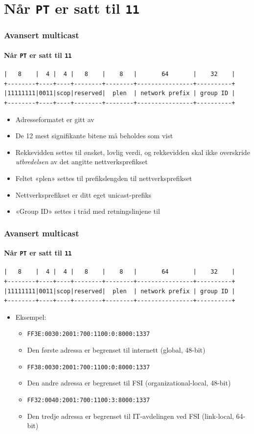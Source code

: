 \section{Når \texttt{PT} er satt til \texttt{11}}
\begin{frame}[fragile]%
  \frametitle{Avansert multicast}
  \framesubtitle{Når \texttt{PT} er satt til \texttt{11}}
  \pause
\begin{Verbatim}[fontsize=\tiny]
|   8    |  4 |  4 |   8    |    8   |       64       |    32    |
+--------+----+----+--------+--------+----------------+----------+
|11111111|0011|scop|reserved|  plen  | network prefix | group ID |
+--------+----+----+--------+--------+----------------+----------+
\end{Verbatim}
  \pause
  \begin{itemize}[<+->]
  \item Adresseformatet er gitt av 
  \item De 12 mest signifikante bitene må beholdes som vist
  \item Rekkevidden settes til ønsket, lovlig verdi, og rekkevidden
    skal ikke overskride \textit{utbredelsen\/} av det angitte
    nettverksprefikset
  \item Feltet «plen» settes til prefikslengden til nettverksprefikset
  \item Nettverksprefikset er ditt eget unicast-prefiks
  \item «Group ID» settes i tråd med retningslinjene til 
  \end{itemize}
\end{frame}

\begin{frame}[fragile]%
  \frametitle{Avansert multicast}
  \framesubtitle{Når \texttt{PT} er satt til \texttt{11}}
\begin{Verbatim}[fontsize=\tiny]
|   8    |  4 |  4 |   8    |    8   |       64       |    32    |
+--------+----+----+--------+--------+----------------+----------+
|11111111|0011|scop|reserved|  plen  | network prefix | group ID |
+--------+----+----+--------+--------+----------------+----------+
\end{Verbatim}
  \begin{itemize}[<+->]
  \item Eksempel:
    \begin{itemize}[<+->]
    \item \texttt{FF3E:0030:2001:700:1100:0:8000:1337}
    \item Den første adressa er begrenset til internett (global, 48-bit)
    \item \texttt{FF38:0030:2001:700:1100:0:8000:1337}
    \item Den andre adressa er begrenset til FSI (organizational-local, 48-bit)
    \item \texttt{FF32:0040:2001:700:1100:3:8000:1337}
    \item Den tredje adressa er begrenset til IT-avdelingen ved FSI (link-local, 64-bit)
    \end{itemize}
  \end{itemize}
\end{frame}

